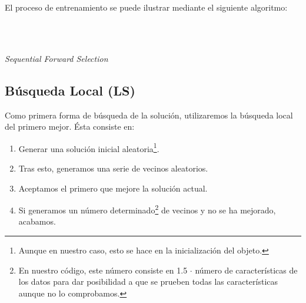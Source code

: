 \documentclass[a4paper, 11pt]{article}
\begin{document}
			El proceso de entrenamiento se puede ilustrar mediante el siguiente algoritmo:

			\begin{algorithm}[H]
				\begin{algorithmic}[1]
					\REQUIRE \ \\
							 \

							\ENDIF
							
							\ENDIF
						\ENDFOR
						
						\ELSE
						\ENDIF
					\ENDWHILE
				\end{algorithmic}
			\caption{\textit{Sequential Forward Selection}}
			\label{SFS}
			\end{algorithm}			

		\subsection{Búsqueda Local (\textbf{LS})}
			Como primera forma de búsqueda de la solución, utilizaremos la búsqueda local del primero
			mejor. Ésta consiste en:
				\begin{enumerate}
					\item Generar una solución inicial aleatoria\footnote{Aunque en nuestro caso, esto
					se hace en la inicialización del objeto.}.
					\item Tras esto, generamos una serie de vecinos aleatorios.
					\item Aceptamos el primero que mejore la solución actual.
					\item Si generamos un número determinado\footnote{En nuestro código, este número
					consiste en 1.5 $\cdot$ número de características de los datos para dar posibilidad
					a que se prueben todas las características aunque no lo comprobamos.} de vecinos y
					no se ha mejorado, acabamos.
				\end{enumerate}
\end{document}
